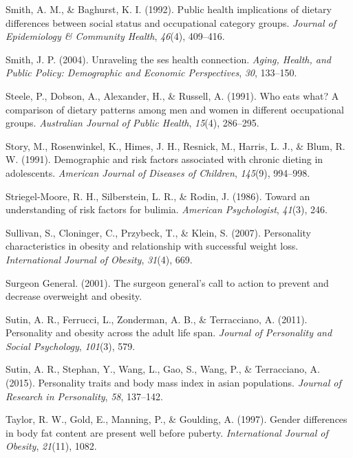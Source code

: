 \documentclass[man]{apa6}
\begin{document}
\leavevmode\hypertarget{ref-smith1992public}{}%
Smith, A. M., \& Baghurst, K. I. (1992). Public health implications of dietary differences between social status and occupational category groups. \emph{Journal of Epidemiology \& Community Health}, \emph{46}(4), 409--416.

\leavevmode\hypertarget{ref-smiith2004}{}%
Smith, J. P. (2004). Unraveling the ses health connection. \emph{Aging, Health, and Public Policy: Demographic and Economic Perspectives}, \emph{30}, 133--150.

\leavevmode\hypertarget{ref-steele1991eats}{}%
Steele, P., Dobson, A., Alexander, H., \& Russell, A. (1991). Who eats what? A comparison of dietary patterns among men and women in different occupational groups. \emph{Australian Journal of Public Health}, \emph{15}(4), 286--295.

\leavevmode\hypertarget{ref-story1991demographic}{}%
Story, M., Rosenwinkel, K., Himes, J. H., Resnick, M., Harris, L. J., \& Blum, R. W. (1991). Demographic and risk factors associated with chronic dieting in adolescents. \emph{American Journal of Diseases of Children}, \emph{145}(9), 994--998.

\leavevmode\hypertarget{ref-striegel1986toward}{}%
Striegel-Moore, R. H., Silberstein, L. R., \& Rodin, J. (1986). Toward an understanding of risk factors for bulimia. \emph{American Psychologist}, \emph{41}(3), 246.

\leavevmode\hypertarget{ref-sullivan2007personality}{}%
Sullivan, S., Cloninger, C., Przybeck, T., \& Klein, S. (2007). Personality characteristics in obesity and relationship with successful weight loss. \emph{International Journal of Obesity}, \emph{31}(4), 669.

\leavevmode\hypertarget{ref-office2001surgeon}{}%
Surgeon General. (2001). The surgeon general's call to action to prevent and decrease overweight and obesity.

\leavevmode\hypertarget{ref-sutin2011personality}{}%
Sutin, A. R., Ferrucci, L., Zonderman, A. B., \& Terracciano, A. (2011). Personality and obesity across the adult life span. \emph{Journal of Personality and Social Psychology}, \emph{101}(3), 579.

\leavevmode\hypertarget{ref-sutin2015personality}{}%
Sutin, A. R., Stephan, Y., Wang, L., Gao, S., Wang, P., \& Terracciano, A. (2015). Personality traits and body mass index in asian populations. \emph{Journal of Research in Personality}, \emph{58}, 137--142.

\leavevmode\hypertarget{ref-taylor1997gender}{}%
Taylor, R. W., Gold, E., Manning, P., \& Goulding, A. (1997). Gender differences in body fat content are present well before puberty. \emph{International Journal of Obesity}, \emph{21}(11), 1082.
\end{document}
